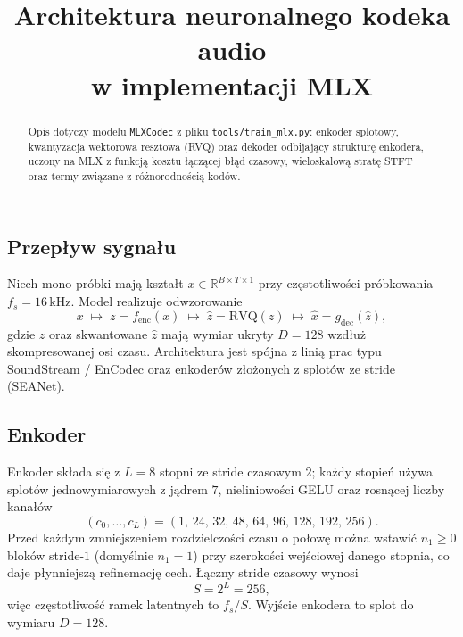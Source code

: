 \documentclass[11pt,a4paper]{article}
\title{Architektura neuronalnego kodeka audio\\w implementacji MLX}
\author{}
\date{}
\begin{document}
\maketitle

\begin{abstract}
Opis dotyczy modelu \texttt{MLXCodec} z pliku \texttt{tools/train\_mlx.py}: enkoder splotowy, kwantyzacja wektorowa resztowa (RVQ) oraz dekoder odbijający strukturę enkodera, uczony na MLX z funkcją kosztu łączącej błąd czasowy, wieloskalową stratę STFT oraz termy związane z różnorodnością kodów.
\end{abstract}

\subsection{Przepływ sygnału}

Niech mono próbki mają kształt $x \in \mathbb{R}^{B \times T \times 1}$ przy częstotliwości próbkowania $f_s = 16\,\mathrm{kHz}$.
Model realizuje odwzorowanie
\begin{equation}
  x \;\mapsto\; z = f_{\mathrm{enc}}(x) \;\mapsto\; \hat z = \mathrm{RVQ}(z) \;\mapsto\; \hat x = g_{\mathrm{dec}}(\hat z),
  \label{eq:pipeline}
\end{equation}
gdzie $z$ oraz skwantowane $\hat z$ mają wymiar ukryty $D = 128$ wzdłuż skompresowanej osi czasu. Architektura jest spójna z linią prac typu SoundStream / EnCodec \cite{soundstream,encodec} oraz enkoderów złożonych z splotów ze stride (SEANet).

\subsection{Enkoder}

Enkoder składa się z $L = 8$ stopni ze stride czasowym $2$; każdy stopień używa splotów jednowymiarowych z jądrem $7$, nieliniowości \textsc{GELU} oraz rosnącej liczby kanałów
\begin{equation}
  (c_0, \ldots, c_{L}) = (1,\, 24,\, 32,\, 48,\, 64,\, 96,\, 128,\, 192,\, 256).
\end{equation}
Przed każdym zmniejszeniem rozdzielczości czasu o połowę można wstawić $n_1 \ge 0$ bloków stride-$1$ (domyślnie $n_1 = 1$) przy szerokości wejściowej danego stopnia, co daje płynniejszą refinemację cech. Łączny stride czasowy wynosi
\begin{equation}
  S = 2^L = 256,
\end{equation}
więc częstotliwość ramek latentnych to $f_s / S$. Wyjście enkodera to splot do wymiaru $D = 128$.
\end{document}
